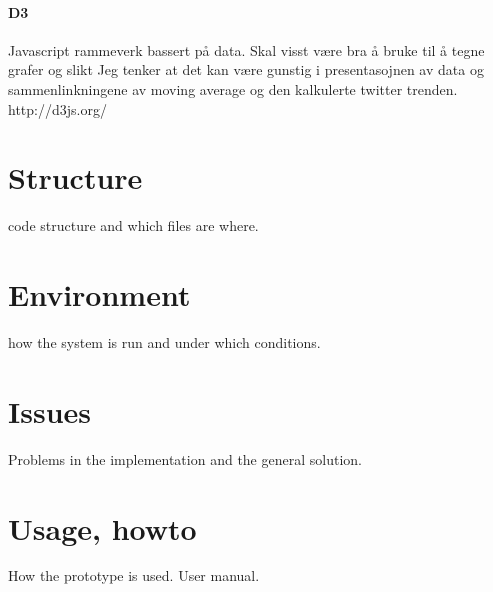 \paragraph{D3}
Javascript rammeverk bassert på data.
Skal visst være bra å bruke til å tegne grafer og slikt
Jeg tenker at det kan være gunstig i presentasojnen av data og sammenlinkningene
av moving average og den kalkulerte twitter trenden.
http://d3js.org/

\section{Structure}
code structure and which files are where.
\section{Environment}
how the system is run and under which conditions.
\section{Issues}
Problems in the implementation and the general solution.

\section{Usage, howto}
How the prototype is used. User manual. 

